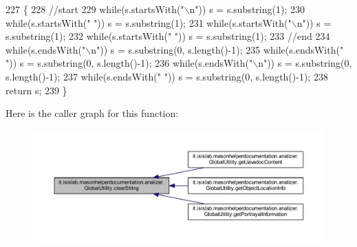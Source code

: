 \begin{DoxyCode}
227                                               \{
228         \textcolor{comment}{//start}
229         \textcolor{keywordflow}{while}(s.startsWith(\textcolor{stringliteral}{"\(\backslash\)n"}))   s = s.substring(1);
230         \textcolor{keywordflow}{while}(s.startsWith(\textcolor{stringliteral}{" "}))    s = s.substring(1);
231         \textcolor{keywordflow}{while}(s.startsWith(\textcolor{stringliteral}{"\(\backslash\)n"}))   s = s.substring(1);
232         \textcolor{keywordflow}{while}(s.startsWith(\textcolor{stringliteral}{" "}))    s = s.substring(1);
233         \textcolor{comment}{//end}
234         \textcolor{keywordflow}{while}(s.endsWith(\textcolor{stringliteral}{"\(\backslash\)n"})) s = s.substring(0, s.length()-1);
235         \textcolor{keywordflow}{while}(s.endsWith(\textcolor{stringliteral}{" "}))  s = s.substring(0, s.length()-1);
236         \textcolor{keywordflow}{while}(s.endsWith(\textcolor{stringliteral}{"\(\backslash\)n"})) s = s.substring(0, s.length()-1);
237         \textcolor{keywordflow}{while}(s.endsWith(\textcolor{stringliteral}{" "}))  s = s.substring(0, s.length()-1);
238         \textcolor{keywordflow}{return} s;
239     \}
\end{DoxyCode}


Here is the caller graph for this function\-:
\nopagebreak
\begin{figure}[H]
\begin{center}
\leavevmode
\includegraphics[width=350pt]{classit_1_1isislab_1_1masonhelperdocumentation_1_1analizer_1_1_global_utility_aa713a96b1680738784bd341d3ffd1e00_icgraph}
\end{center}
\end{figure}


